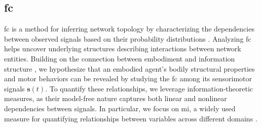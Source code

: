 \subsection{\Acl{fc}}
\ac{fc} is a method for inferring network topology by characterizing the dependencies between observed signals based on their probability distributions \cite{Friston2011Functionaleffectiveconnectivity}. Analyzing \ac{fc} helps uncover underlying structures describing interactions between network entities. Building on the connection between embodiment and information structure \cite{Pfeifer2007Selforganizationembodiment}, we hypothesize that an embodied agent’s bodily structural properties and motor behaviors can be revealed by studying the \ac{fc} among its sensorimotor signals $\bm{s}(t)$. To quantify these relationships, we leverage information-theoretic measures, as their model-free nature captures both linear and nonlinear dependencies between signals. In particular, we focus on \ac{mi}, a widely used measure for quantifying relationships between variables across different domains \cite{Steuer2002mutualinformationdetecting}.


